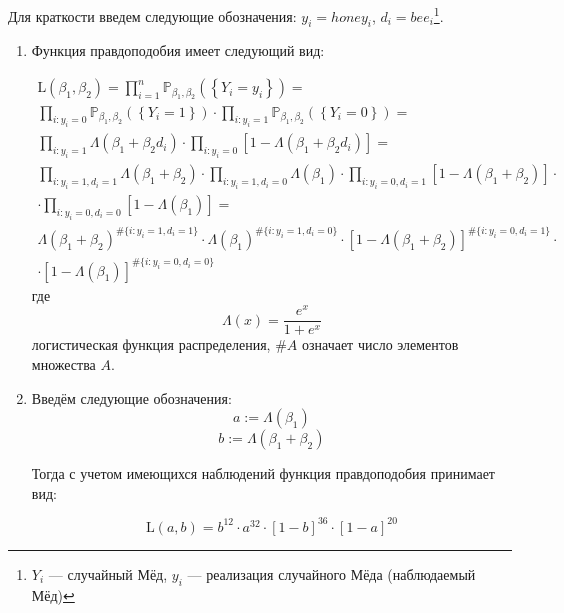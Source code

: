 \documentclass[pdftex,11pt,openany]{book}\usepackage[]{graphicx}\usepackage[]{color}
\begin{document}
\begin{solution}
Для краткости введем следующие обозначения: $y_i = honey_i$, $d_i = bee_i$\footnote{$Y_i$ --- случайный Мёд, $y_i$ --- реализация случайного Мёда (наблюдаемый Мёд)}.

\begin{enumerate}
\item Функция правдоподобия имеет следующий вид:

\begin{multline}
\text{L}(\beta_1, \beta_2) = \prod_{i=1}^n \mathbb{P}_{\beta_1, \beta_2} \left(\left\lbrace Y_i = y_i \right\rbrace \right) =\\
 \prod_{i: y_i = 0} \mathbb{P}_{\beta_1, \beta_2} \left(\left\lbrace Y_i = 1 \right\rbrace \right) \cdot \prod_{i: y_i = 1} \mathbb{P}_{\beta_1, \beta_2} \left(\left\lbrace Y_i = 0 \right\rbrace \right) =\\
\prod_{i: y_i = 1} \Lambda(\beta_1 + \beta_2 d_i) \cdot \prod_{i: y_i = 0} [1 - \Lambda(\beta_1 + \beta_2 d_i)] = \\
\prod_{i: y_i = 1, d_i = 1} \Lambda(\beta_1 + \beta_2) \cdot \prod_{i: y_i = 1, d_i = 0} \Lambda(\beta_1) \cdot \prod_{i: y_i = 0, d_i = 1} [1 - \Lambda(\beta_1 + \beta_2)] \cdot \\
\cdot \prod_{i: y_i = 0, d_i = 0} [1 - \Lambda(\beta_1)] = \\
\Lambda(\beta_1 + \beta_2)^{\#\{i: y_i=1, d_i=1\}} \cdot \Lambda(\beta_1)^{\#\{i: y_i=1, d_i=0\}} \cdot [1 - \Lambda(\beta_1 + \beta_2)]^{\#\{i: y_i=0, d_i=1\}} \cdot \\
\cdot  [1 - \Lambda(\beta_1)]^{\#\{i: y_i=0, d_i=0\}}
\end{multline}
где 
\begin{equation}
\label{eq: logist df}\Lambda(x) = \frac{e^x}{1 + e^x}
\end{equation}
логистическая функция распределения, $\#A$ означает число элементов множества $A$.

\item Введём следующие обозначения:
\begin{equation}
\label{eq: short a}a := \Lambda(\beta_1)
\end{equation}
\begin{equation}
\label{eq: short b}b := \Lambda(\beta_1 + \beta_2)
\end{equation}

Тогда с учетом имеющихся наблюдений функция правдоподобия принимает вид:

$$\text{L}(a, b) = b^{12} \cdot a^{32} \cdot [1 - b]^{36} \cdot [1 - a]^{20}$$


\end{enumerate}
\end{solution}
\end{document}
